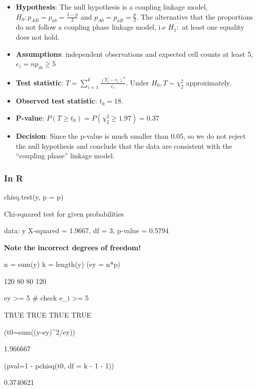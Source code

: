 \documentclass[a4paper]{article}\usepackage[]{graphicx}\usepackage[]{xcolor}
\begin{document}
\begin{itemize}
	\item \textbf{Hypothesis}: The null hypothesis is a coupling linkage model,\( H_0 : p_{AB} = p_{ab} = \frac{1-p}{2} \) and \( p_{Ab} = p_{aB} = \frac{p}{2} \). The alternative that the proportions do not follow a coupling phase linkage model, i.e \( H_1: \) at least one equality does not hold.
	\item \textbf{Assumptions}: independent observations and expected cell counts at least 5, \( e_i = np_{i0} \geq 5 \)
	\item \textbf{Test statistic}: \( T = \sum\limits_{i=1}^{k} \frac{(Y_i - e_i)^2}{e_i} \). Under \( H_0, T \sim \chi^2_2 \) approximately.
	\item \textbf{Observed test statistic}: \( t_0 = 18 \).
	\item \textbf{P-value}: \( P(T\geq t_0) = P(\chi^2_2 \geq 1.97) =  0.37 \)
	\item \textbf{Decision}: Since the p-value is much smaller than 0.05,  so we do not reject the null hypothesis and conclude that the data are consistent with the ``coupling phase'' linkage model.
\end{itemize}
\subsubsection{In R}
\begin{Schunk}
\begin{Sinput}
chisq.test(y, p = p)
\end{Sinput}
\begin{Soutput}

	Chi-squared test for given probabilities

data:  y
X-squared = 1.9667, df = 3, p-value = 0.5794
\end{Soutput}
\end{Schunk}
\begin{tcolorbox}[bluestylecolor]
	\textbf{Note the incorrect degrees of freedom!}
\end{tcolorbox}
\begin{Schunk}
\begin{Sinput}
n = sum(y)
k = length(y)
(ey = n*p)
\end{Sinput}
\begin{Soutput}
[1] 120  80  80 120
\end{Soutput}
\begin{Sinput}
ey >= 5 # check e_i >= 5
\end{Sinput}
\begin{Soutput}
[1] TRUE TRUE TRUE TRUE
\end{Soutput}
\begin{Sinput}
(t0=sum((y-ey)^2/ey))
\end{Sinput}
\begin{Soutput}
[1] 1.966667
\end{Soutput}
\begin{Sinput}
(pval=1 - pchisq(t0, df = k - 1 - 1))
\end{Sinput}
\begin{Soutput}
[1] 0.3740621
\end{Soutput}
\end{Schunk}
\end{document}

